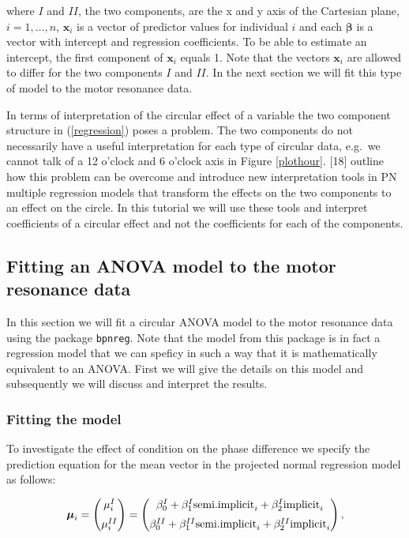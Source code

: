 \documentclass[11pt,]{article}
\begin{document}
where \(I\) and \(II\), the two components, are the x and y axis of the
Cartesian plane, \(i = 1, \dots, n\), \(\boldsymbol{x}_{i}\) is a vector
of predictor values for individual \(i\) and each \(\boldsymbol{\beta}\)
is a vector with intercept and regression coefficients. To be able to
estimate an intercept, the first component of \(\boldsymbol{x}_{i}\)
equals 1. Note that the vectors \(\boldsymbol{x}_{i}\) are allowed to
differ for the two components \(I\) and \(II\). In the next section we
will fit this type of model to the motor resonance data.

In terms of interpretation of the circular effect of a variable the two
component structure in (\ref{regression}) poses a problem. The two
components do not necessarily have a useful interpretation for each type
of circular data, e.g.~we cannot talk of a 12 o'clock and 6 o'clock axis
in Figure \ref{plothour}. {[}18{]} outline how this problem can be
overcome and introduce new interpretation tools in PN multiple
regression models that transform the effects on the two components to an
effect on the circle. In this tutorial we will use these tools and
interpret coefficients of a circular effect and not the coefficients for
each of the components.

\subsection{Fitting an ANOVA model to the motor resonance data}\label{RegModelMotor}

In this section we will fit a circular ANOVA model to the motor
resonance data using the package \verb|bpnreg|. Note that the model from
this package is in fact a regression model that we can speficy in such a
way that it is mathematically equivalent to an ANOVA. First we will give
the details on this model and subsequently we will discuss and interpret
the results.

\subsubsection{Fitting the model}\label{fitMotor}

To investigate the effect of condition on the phase difference we
specify the prediction equation for the mean vector in the projected
normal regression model as follows:

\begin{equation}\label{regressionmotor}
\boldsymbol{\mu}_{i} = \begin{pmatrix}
  \mu_{i}^{I}  \vspace{0.2cm}  \\
\mu_{i}^{II}
 \end{pmatrix}=\begin{pmatrix}
  \beta_{0}^{I} +  \beta_{1}^{I}\text{semi.implicit}_{i}+  \beta_{2}^{I}\text{implicit}_{i} \vspace{0.2cm}  \\
  \beta_{0}^{II} +  \beta_{1}^{II}\text{semi.implicit}_{i}+  \beta_{2}^{II}\text{implicit}_{i}  
 \end{pmatrix},
\end{equation}
\end{document}
